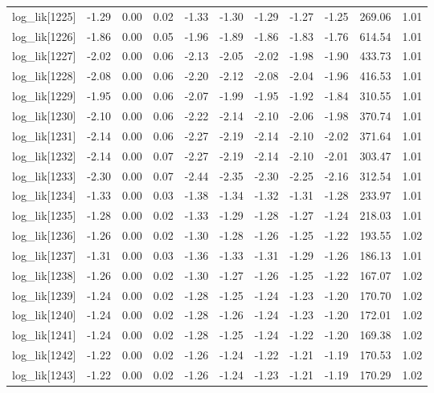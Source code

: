 \begin{table}[ht]
\begin{tabular}{rrrrrrrrrrr}
  log\_lik[1225] & -1.29 & 0.00 & 0.02 & -1.33 & -1.30 & -1.29 & -1.27 & -1.25 & 269.06 & 1.01 \\ 
  log\_lik[1226] & -1.86 & 0.00 & 0.05 & -1.96 & -1.89 & -1.86 & -1.83 & -1.76 & 614.54 & 1.01 \\ 
  log\_lik[1227] & -2.02 & 0.00 & 0.06 & -2.13 & -2.05 & -2.02 & -1.98 & -1.90 & 433.73 & 1.01 \\ 
  log\_lik[1228] & -2.08 & 0.00 & 0.06 & -2.20 & -2.12 & -2.08 & -2.04 & -1.96 & 416.53 & 1.01 \\ 
  log\_lik[1229] & -1.95 & 0.00 & 0.06 & -2.07 & -1.99 & -1.95 & -1.92 & -1.84 & 310.55 & 1.01 \\ 
  log\_lik[1230] & -2.10 & 0.00 & 0.06 & -2.22 & -2.14 & -2.10 & -2.06 & -1.98 & 370.74 & 1.01 \\ 
  log\_lik[1231] & -2.14 & 0.00 & 0.06 & -2.27 & -2.19 & -2.14 & -2.10 & -2.02 & 371.64 & 1.01 \\ 
  log\_lik[1232] & -2.14 & 0.00 & 0.07 & -2.27 & -2.19 & -2.14 & -2.10 & -2.01 & 303.47 & 1.01 \\ 
  log\_lik[1233] & -2.30 & 0.00 & 0.07 & -2.44 & -2.35 & -2.30 & -2.25 & -2.16 & 312.54 & 1.01 \\ 
  log\_lik[1234] & -1.33 & 0.00 & 0.03 & -1.38 & -1.34 & -1.32 & -1.31 & -1.28 & 233.97 & 1.01 \\ 
  log\_lik[1235] & -1.28 & 0.00 & 0.02 & -1.33 & -1.29 & -1.28 & -1.27 & -1.24 & 218.03 & 1.01 \\ 
  log\_lik[1236] & -1.26 & 0.00 & 0.02 & -1.30 & -1.28 & -1.26 & -1.25 & -1.22 & 193.55 & 1.02 \\ 
  log\_lik[1237] & -1.31 & 0.00 & 0.03 & -1.36 & -1.33 & -1.31 & -1.29 & -1.26 & 186.13 & 1.01 \\ 
  log\_lik[1238] & -1.26 & 0.00 & 0.02 & -1.30 & -1.27 & -1.26 & -1.25 & -1.22 & 167.07 & 1.02 \\ 
  log\_lik[1239] & -1.24 & 0.00 & 0.02 & -1.28 & -1.25 & -1.24 & -1.23 & -1.20 & 170.70 & 1.02 \\ 
  log\_lik[1240] & -1.24 & 0.00 & 0.02 & -1.28 & -1.26 & -1.24 & -1.23 & -1.20 & 172.01 & 1.02 \\ 
  log\_lik[1241] & -1.24 & 0.00 & 0.02 & -1.28 & -1.25 & -1.24 & -1.22 & -1.20 & 169.38 & 1.02 \\ 
  log\_lik[1242] & -1.22 & 0.00 & 0.02 & -1.26 & -1.24 & -1.22 & -1.21 & -1.19 & 170.53 & 1.02 \\ 
  log\_lik[1243] & -1.22 & 0.00 & 0.02 & -1.26 & -1.24 & -1.23 & -1.21 & -1.19 & 170.29 & 1.02 \\ 

\end{tabular}
\end{table}
